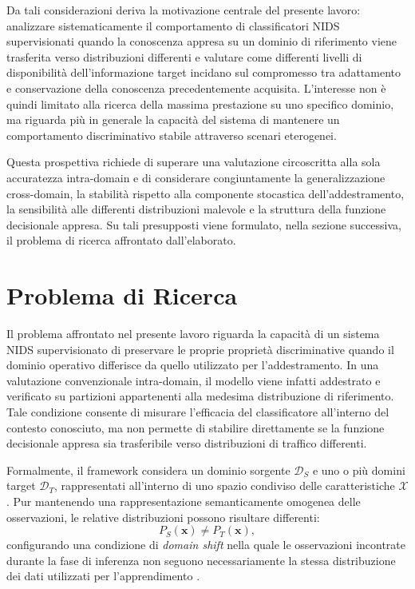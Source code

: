 Da tali considerazioni deriva la motivazione centrale del presente lavoro: analizzare sistematicamente il comportamento di classificatori NIDS supervisionati quando la conoscenza appresa su un dominio di riferimento viene trasferita verso distribuzioni differenti e valutare come differenti livelli di disponibilità dell'informazione target incidano sul compromesso tra adattamento e conservazione della conoscenza precedentemente acquisita. 
L'interesse non è quindi limitato alla ricerca della massima prestazione su uno specifico dominio, ma riguarda più in generale la capacità del sistema di mantenere un comportamento discriminativo stabile attraverso scenari eterogenei.

Questa prospettiva richiede di superare una valutazione circoscritta alla sola accuratezza intra-domain e di considerare congiuntamente la generalizzazione cross-domain, la stabilità rispetto alla componente stocastica dell'addestramento, la sensibilità alle differenti distribuzioni malevole e la struttura della funzione decisionale appresa. 
Su tali presupposti viene formulato, nella sezione successiva, il problema di ricerca affrontato dall'elaborato.




\section{Problema di Ricerca}
\label{sec:intro_problema}

Il problema affrontato nel presente lavoro riguarda la capacità di un sistema NIDS supervisionato di preservare le proprie proprietà discriminative quando il dominio operativo differisce da quello utilizzato per l'addestramento. 
In una valutazione convenzionale intra-domain, il modello viene infatti addestrato e verificato su partizioni appartenenti alla medesima distribuzione di riferimento. 
Tale condizione consente di misurare l'efficacia del classificatore all'interno del contesto conosciuto, ma non permette di stabilire direttamente se la funzione decisionale appresa sia trasferibile verso distribuzioni di traffico differenti.

Formalmente, il framework considera un dominio sorgente $\mathcal{D}_{S}$ e uno o più domini target $\mathcal{D}_{T}$, rappresentati all'interno di uno spazio condiviso delle caratteristiche $\mathcal{X}$. 
Pur mantenendo una rappresentazione semanticamente omogenea delle osservazioni, le relative distribuzioni possono risultare differenti:
\begin{equation}
    P_{S}(\mathbf{x}) \neq P_{T}(\mathbf{x}),
\end{equation}
configurando una condizione di \textit{domain shift} nella quale le osservazioni incontrate durante la fase di inferenza non seguono necessariamente la stessa distribuzione dei dati utilizzati per l'apprendimento \cite{pan2010}.

